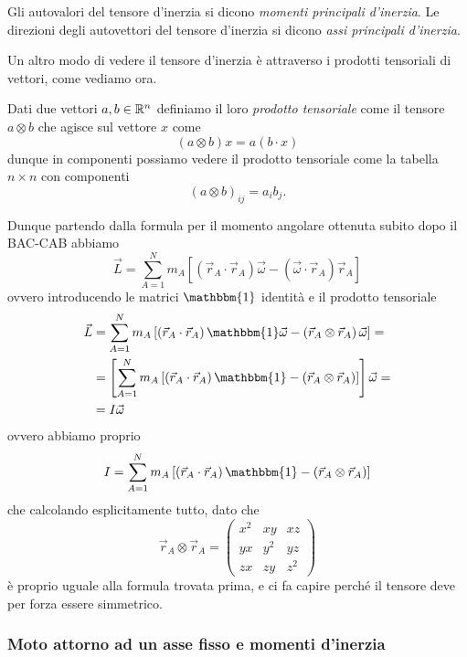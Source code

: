 \documentclass[11pt]{scrartcl}
\newcommand{\posit}{\vec{r}}
\begin{document}
	\begin{definition}
		Gli autovalori del tensore d'inerzia si dicono \textit{momenti principali d'inerzia}. Le direzioni degli autovettori del tensore d'inerzia si dicono \textit{assi principali d'inerzia}.
	\end{definition}
	Un altro modo di vedere il tensore d'inerzia è attraverso i prodotti tensoriali di vettori, come vediamo ora.
	\begin{definition}
		Dati due vettori $a,b\in\mathbb R^n$ definiamo il loro \textit{prodotto tensoriale} come il tensore $a\otimes b$ che agisce sul vettore $x$ come
		$$\left(a\otimes b\right)x=a\left(b\cdot x\right)$$
		dunque in componenti possiamo vedere il prodotto tensoriale come la tabella $n\times n$ con componenti
		$$\left(a\otimes b\right)_{ij}=a_ib_j.$$
	\end{definition}
	Dunque partendo dalla formula per il momento angolare ottenuta subito dopo il BAC-CAB abbiamo
	$$\vec{L}=\sum_{A=1}^{N}m_A\left[\left(\posit_A\cdot\posit_A\right)\vec{\omega}-\left(\vec{\omega}\cdot \posit_A\right)\posit_A\right]$$
	ovvero introducendo le matrici $\mathbbm{1}$ identità e il prodotto tensoriale 
	\begin{align*}
		\vec{L}&= \sum_{A=1}^{N}m_A\left[\left(\posit_A\cdot\posit_A\right)\mathbbm{1}\vec{\omega}-\left(\posit_A\otimes \posit_A\right)\vec{\omega}\right]= \\
		&=\left[\sum_{A=1}^{N}m_A\left[\left(\posit_A\cdot\posit_A\right)\mathbbm{1}-\left(\posit_A\otimes \posit_A\right)\right]\right]\vec{\omega}= \\
		&=I\vec{\omega}
	\end{align*}
	ovvero abbiamo proprio
	$$I=\sum_{A=1}^{N}m_A\left[\left(\posit_A\cdot\posit_A\right)\mathbbm{1}-\left(\posit_A\otimes \posit_A\right)\right]$$
	che calcolando esplicitamente tutto, dato che 
	$$\posit_A\otimes \posit_A=\begin{pmatrix}
		x^2 & xy & xz \\
		yx & y^2 & yz \\
		zx & zy & z^2
	\end{pmatrix}$$
	è proprio uguale alla formula trovata prima, e ci fa capire perché il tensore deve per forza essere simmetrico.
	\subsubsection{Moto attorno ad un asse fisso e momenti d'inerzia}
	
\end{document}
